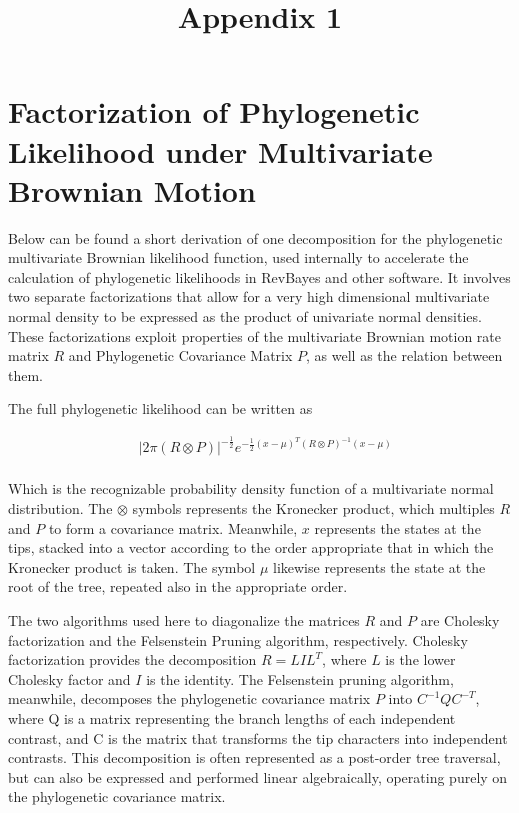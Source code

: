 \documentclass[10pt]{article}
\title{\vspace{-2.5cm}Appendix 1}
\author{}
\date{}
\begin{document}
\maketitle{}

\section*{Factorization of Phylogenetic Likelihood under Multivariate Brownian Motion}

Below can be found a short derivation of one decomposition for the phylogenetic multivariate Brownian likelihood function, used internally to accelerate the calculation of phylogenetic likelihoods in RevBayes and other software. It involves two separate factorizations that allow for a very high dimensional multivariate normal density to be expressed as the product of univariate normal densities. These factorizations exploit properties of the multivariate Brownian motion rate matrix $R$ and Phylogenetic Covariance Matrix $P$, as well as the relation between them. 

The full phylogenetic likelihood can be written as

\begin{align*}
&|2\pi(R \otimes P)|^{-\frac{1}{2}}e^{-\frac{1}{2}(x-\mu)^T(R \otimes P)^{-1}(x-\mu)}\\
\end{align*}

Which is the recognizable probability density function of a multivariate normal distribution. The $\otimes$ symbols represents the Kronecker product, which multiples $R$ and $P$ to form a covariance matrix. Meanwhile, $x$ represents the states at the tips, stacked into a vector according to the order appropriate that in which the Kronecker product is taken. The symbol $\mu$ likewise represents the state at the root of the tree, repeated also in the appropriate order.

The two algorithms used here to diagonalize the matrices $R$ and $P$ are Cholesky factorization and the Felsenstein Pruning algorithm, respectively. Cholesky factorization provides the decomposition $R = LIL^T$, where $L$ is the lower Cholesky factor and $I$ is the identity. The Felsenstein pruning algorithm, meanwhile, decomposes the phylogenetic covariance matrix $P$ into $C^{-1}QC^{-T}$, where Q is a matrix representing the branch lengths of each independent contrast, and C is the matrix that transforms the tip characters into independent contrasts. This decomposition is often represented as a post-order tree traversal, but can also be expressed and performed linear algebraically, operating purely on the phylogenetic covariance matrix.
\end{document}
